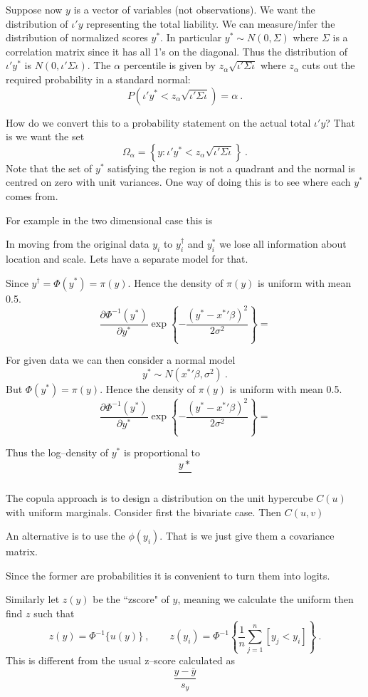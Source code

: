 Suppose now $y$ is a vector of variables (not observations).  We want the distribution of $\iota'y$ representing the total liability.  We can measure/infer the distribution of normalized scores $y^*$.   In particular $y^*\sim N(0,\Sigma)$ where $\Sigma$ is a correlation matrix since it has all 1's on the diagonal.  Thus the distribution of $\iota'y^*$ is $N(0,\iota'\Sigma\iota)$.   The $\alpha$ percentile is given by $z_\alpha\sqrt{\iota'\Sigma\iota}$ where $z_\alpha$ cuts out the required probability in a standard normal:
$$
P(\iota'y^*<z_\alpha\sqrt{\iota'\Sigma\iota})=\alpha\ .
$$

How do we convert this to a probability statement on the actual total $\iota'y$?  That is we want the set  
$$
\Omega_\alpha = \left\{y : \iota'y^*<z_\alpha\sqrt{\iota'\Sigma\iota}\right\}\ .
$$
Note that the set of $y^*$ satisfying the region is not a quadrant and the normal is centred on zero with unit variances.
One way of doing this is to see where each $y^*$ comes from.   

For example in the two dimensional case this is 

 In moving from the original data $y_i$ to $y_i^\dag$ and $y_i^*$ we lose all information about location and scale.  Lets have a separate model for that.

Since  $y^\dag=\Phi(y^*)=\pi(y)$.  Hence the density of $\pi(y)$ is uniform with mean 0.5.
$$
\frac{\partial \Phi^{-1}(y^*)}{\partial y^*} \exp\left\{-\frac{(y^*-{x^*}'\beta)^2}{2\sigma^2}\right\}= 
$$
 

For given data we can then consider a normal model 
$$
y^* \sim N({x^*}'\beta,\sigma^2)\ .
$$
But $\Phi(y^*)=\pi(y)$.  Hence the density of $\pi(y)$ is uniform with mean 0.5.
$$
\frac{\partial \Phi^{-1}(y^*)}{\partial y^*} \exp\left\{-\frac{(y^*-{x^*}'\beta)^2}{2\sigma^2}\right\}= 
$$

Thus the log--density of $y^*$ is proportional to 
$$
\frac{y*}{}
$$

The copula approach is to design a distribution on the unit hypercube $C(u)$ with uniform marginals.  Consider first 
the bivariate case.  Then $C(u,v)$

An alternative is to use the $\phi(y_i)$.  That is we just give them a covariance matrix.

Since the former are probabilities it is convenient to turn them into logits.



  Similarly let $z(y)$ be the ``zscore" of $y$, meaning we calculate the uniform then find $z$ such that
$$
z(y)=\Phi^{-1}\{u(y)\}\ ,\qquad z(y_i)=\Phi^{-1}\left\{\frac{1}{n} \sum_{j=1}^n[y_j<y_i]\right\}\ .
$$
This is different from the usual z--score calculated as
$$
\frac{y-\bar y}{s_y}
$$


